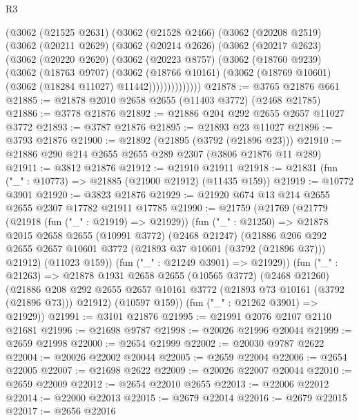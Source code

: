 \begin{lexlean}{R3}
\begin{coremodule}
      (@3062
        (@21525 @2631)
        (@3062
          (@21528 @2466)
          (@3062
            (@20208 @2519)
            (@3062
              (@20211 @2629)
              (@3062
                (@20214 @2626)
                (@3062
                  (@20217 @2623)
                  (@3062
                    (@20220 @2620)
                    (@3062
                      (@20223 @8757)
                      (@3062
                        (@18760 @9239)
                        (@3062
                          (@18763 @9707)
                          (@3062
                            (@18766 @10161)
                            (@3062 (@18769 @10601) (@3062 (@18284 @11027) @11442))))))))))))))
@21878 := @3765 @21876 @661
@21885 := @21878 @2010 @2658 @2655 (@11403 @3772) (@2468 @21785)
@21886 := @3778 @21876
@21892 := @21886 @204 @292 @2655 @2657 @11027 @3772
@21893 := @3787 @21876
@21895 := @21893 @23 @11027
@21896 := @3793 @21876
@21900 := @21892 (@21895 (@3792 (@21896 @23)))
@21910 := @21886 @290 @214 @2655 @2655 @289 @2307 (@3806 @21876 @11 @289)
@21911 := @3812 @21876
@21912 := @21910 @21911
@21918 := @21831 (fun ("_" : @10773) => @21885 (@21900 @21912) (@11435 @159))
@21919 := @10772 @3901
@21920 := @3823 @21876
@21929 := @21920 @674 @13 @214 @2655 @2655 @2307 @17782 @21911 @17785
@21990 := @21759
    (@21769
      (@21779
        (@21918 (fun ("_" : @21919) => @21929))
        (fun ("_" : @21250) =>
        @21878
          @2015
          @2658
          @2655
          (@10991 @3772)
          (@2468 @21247)
          (@21886
            @206
            @292
            @2655
            @2657
            @10601
            @3772
            (@21893 @37 @10601 (@3792 (@21896 @37)))
            @21912)
          (@11023 @159))
        (fun ("_" : @21249 @3901) => @21929))
      (fun ("_" : @21263) =>
      @21878
        @1931
        @2658
        @2655
        (@10565 @3772)
        (@2468 @21260)
        (@21886 @208 @292 @2655 @2657 @10161 @3772 (@21893 @73 @10161 (@3792 (@21896 @73))) @21912)
        (@10597 @159))
      (fun ("_" : @21262 @3901) => @21929))
@21991 := @3101 @21876
@21995 := @21991 @2076 @2107 @2110 @21681
@21996 := @21698 @9787
@21998 := @20026 @21996 @20044
@21999 := @2659 @21998
@22000 := @2654 @21999
@22002 := @20030 @9787 @2622
@22004 := @20026 @22002 @20044
@22005 := @2659 @22004
@22006 := @2654 @22005
@22007 := @21698 @2622
@22009 := @20026 @22007 @20044
@22010 := @2659 @22009
@22012 := @2654 @22010 @2655
@22013 := @22006 @22012
@22014 := @22000 @22013
@22015 := @2679 @22014
@22016 := @2679 @22015
@22017 := @2656 @22016

\end{coremodule}
\end{lexlean}
